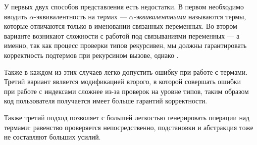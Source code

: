 У первых двух способов представления есть недостатки. В первом необходимо вводить $\alpha$-эквивалентность на термах --- \textit{$\alpha$-эквивалентными} называются термы, которые отличаются только в именовании связанных переменных. Во втором варианте возникают сложности с работой под связываниями переменных --- а именно, так как процесс проверки типов рекурсивен, мы должны гарантировать корректность подтермов при рекурсином вызове, однако .

Также в каждом из этих случаев легко допустить ошибку при работе с термами. Третий вариант является модификацией второго, в которой совершать ошибки при работе с индексами сложнее из-за проверок на уровне типов, таким образом код пользователя получается имеет больше гарантий корректности.

Также третий подход позволяет с большей легкостью генерировать операции над термами: равенство проверяется непосредственно, подстановки и абстракция тоже не составляют больших усилий.





